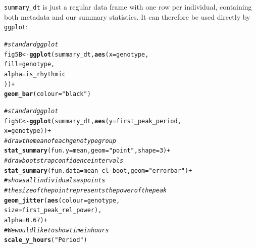 \documentclass[10pt,letterpaper]{article}\usepackage[]{graphicx}\usepackage[]{color}
\makeatletter
\newcommand{\hlnum}[1]{\textcolor[rgb]{0.686,0.059,0.569}{#1}}%
\newcommand{\hlstr}[1]{\textcolor[rgb]{0.192,0.494,0.8}{#1}}%
\newcommand{\hlcom}[1]{\textcolor[rgb]{0.678,0.584,0.686}{\textit{#1}}}%
\newcommand{\hlopt}[1]{\textcolor[rgb]{0,0,0}{#1}}%
\newcommand{\hlstd}[1]{\textcolor[rgb]{0.345,0.345,0.345}{#1}}%
\newcommand{\hlkwb}[1]{\textcolor[rgb]{0.69,0.353,0.396}{#1}}%
\newcommand{\hlkwc}[1]{\textcolor[rgb]{0.333,0.667,0.333}{#1}}%
\newcommand{\hlkwd}[1]{\textcolor[rgb]{0.737,0.353,0.396}{\textbf{#1}}}%
\newenvironment{kframe}{%
 \def\at@end@of@kframe{}%
 \ifinner\ifhmode%
  \def\at@end@of@kframe{\end{minipage}}%
  \begin{minipage}{\columnwidth}%
 \fi\fi%
 \def\FrameCommand##1{\hskip\@totalleftmargin \hskip-\fboxsep
 \colorbox{shadecolor}{##1}\hskip-\fboxsep
     \hskip-\linewidth \hskip-\@totalleftmargin \hskip\columnwidth}%
 \MakeFramed {\advance\hsize-\width
   \@totalleftmargin\z@ \linewidth\hsize
   \@setminipage}}%
 {\par\unskip\endMakeFramed%
 \at@end@of@kframe}
\newenvironment{knitrout}{}{} %
\makeatother
\begin{document}
\texttt{summary\_dt} is just a regular data frame with one row per individual, containing both metadata and our summary statistics. 
It can therefore be used directly by \texttt{ggplot}:

\begin{knitrout}
\color{fgcolor}\begin{kframe}
\begin{alltt}
\hlcom{# standard ggplot}
\hlstd{fig5B} \hlkwb{<-} \hlkwd{ggplot}\hlstd{(summary_dt,} \hlkwd{aes}\hlstd{(}\hlkwc{x} \hlstd{= genotype,}
                                \hlkwc{fill} \hlstd{= genotype,}
                                \hlkwc{alpha} \hlstd{= is_rhythmic}
                                \hlstd{))} \hlopt{+}
              \hlkwd{geom_bar}\hlstd{(}\hlkwc{colour}\hlstd{=}\hlstr{"black"}\hlstd{)}
\end{alltt}
\end{kframe}
\end{knitrout}

\begin{knitrout}
\color{fgcolor}\begin{kframe}
\begin{alltt}
\hlcom{# standard ggplot}
\hlstd{fig5C} \hlkwb{<-} \hlkwd{ggplot}\hlstd{(summary_dt,} \hlkwd{aes}\hlstd{(}\hlkwc{y} \hlstd{= first_peak_period,}
                                \hlkwc{x} \hlstd{= genotype))} \hlopt{+}
              \hlcom{# draw the mean of each genotype group}
              \hlkwd{stat_summary}\hlstd{(}\hlkwc{fun.y} \hlstd{= mean,} \hlkwc{geom} \hlstd{=} \hlstr{"point"}\hlstd{,} \hlkwc{shape}\hlstd{=}\hlnum{3}\hlstd{)} \hlopt{+}
              \hlcom{# draw bootstrap confidence intervals}
              \hlkwd{stat_summary}\hlstd{(}\hlkwc{fun.data} \hlstd{= mean_cl_boot,} \hlkwc{geom} \hlstd{=} \hlstr{"errorbar"}\hlstd{)} \hlopt{+}
              \hlcom{# shows all individuals as points}
              \hlcom{# the size of the point represents the power of the peak}
              \hlkwd{geom_jitter}\hlstd{(}\hlkwd{aes}\hlstd{(}\hlkwc{colour} \hlstd{= genotype,}
                              \hlkwc{size} \hlstd{= first_peak_rel_power),}
                              \hlkwc{alpha} \hlstd{=} \hlnum{0.67}\hlstd{)} \hlopt{+}
              \hlcom{# We would like to show time in hours}
              \hlkwd{scale_y_hours}\hlstd{(}\hlstr{"Period"}\hlstd{)}
\end{alltt}
\end{kframe}
\end{knitrout}
\end{document}
